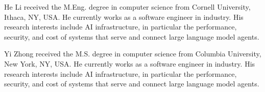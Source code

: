 \documentclass{ieeeaccess}
\begin{document}
\newpage
\begin{IEEEbiographynophoto}{He Li}
received the M.Eng. degree in computer science from Cornell University, Ithaca, NY, USA. He currently works as a software engineer in industry. His research interests include AI infrastructure, in particular the performance, security, and cost of systems that serve and connect large language model agents.
\end{IEEEbiographynophoto}

\begin{IEEEbiographynophoto}{Yi Zhong}
received the M.S. degree in computer science from Columbia University, New York, NY, USA. He currently works as a software engineer in industry. His research interests include AI infrastructure, in particular the performance, security, and cost of systems that serve and connect large language model agents.
\end{IEEEbiographynophoto}

\EOD
\vspace*{0pt plus 1filll}
\end{document}
